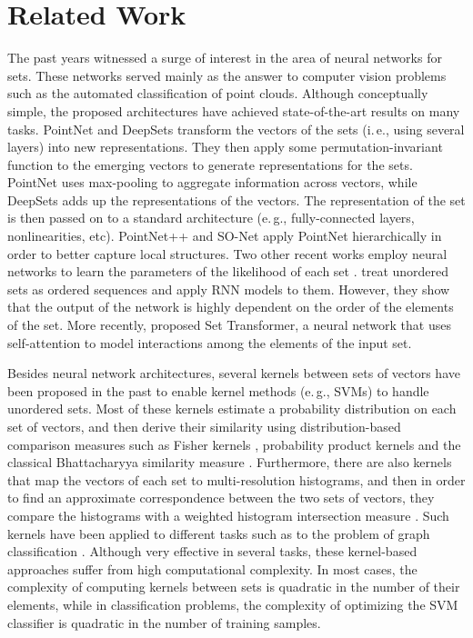 \documentclass[twoside]{article}
\newcommand{\eg}{e.\,g., }
\newcommand{\ie}{i.\,e., }
\begin{document}
\section{Related Work}\label{sec:related_work}
The past years witnessed a surge of interest in the area of neural networks for sets.
These networks served mainly as the answer to computer vision problems such as the automated classification of point clouds.
Although conceptually simple, the proposed architectures have achieved state-of-the-art results on many tasks.
PointNet \citep{qi2017pointnet} and DeepSets \citep{zaheer2017deep} transform the vectors of the sets (\ie using several layers) into new representations.
They then apply some permutation-invariant function to the emerging vectors to generate representations for the sets.
PointNet uses max-pooling to aggregate information across vectors, while DeepSets adds up the representations of the vectors.
The representation of the set is then passed on to a standard architecture (\eg fully-connected layers, nonlinearities, etc).
PointNet++ \citep{qi2017pointnet++} and SO-Net \citep{li2018so} apply PointNet hierarchically in order to better capture local structures.
Two other recent works employ neural networks to learn the parameters of the likelihood of each set \citep{rezatofighi2017deepsetnet,rezatofighi2018joint}.
\cite{vinyals2015order} treat unordered sets as ordered sequences and apply RNN models to them.
However, they show that the output of the network is highly dependent on the order of the elements of the set.
More recently, \cite{lee2019set} proposed Set Transformer, a neural network that uses self-attention to model interactions among the elements of the input set.

Besides neural network architectures, several kernels between sets of vectors have been proposed in the past to enable kernel methods (\eg SVMs) to handle unordered sets.
Most of these kernels estimate a probability distribution on each set of vectors, and then derive their similarity using distribution-based comparison measures such as Fisher kernels \citep{jaakkola1999exploiting}, probability product kernels \citep{jebara2004probability,lyu2005kernel} and the classical Bhattacharyya similarity measure \citep{kondor2003kernel}.
Furthermore, there are also kernels that map the vectors of each set to multi-resolution histograms, and then in order to find an approximate correspondence between the two sets of vectors, they compare the histograms with a weighted histogram intersection measure  \citep{grauman2007pyramid,grauman2007approximate}.
Such kernels have been applied to different tasks such as to the problem of graph classification \citep{nikolentzos2017matching}.
Although very effective in several tasks, these kernel-based approaches suffer from high computational complexity.
In most cases, the complexity of computing kernels between sets is quadratic in the number of their elements, while in classification problems, the complexity of optimizing the SVM classifier is quadratic in the number of training samples. 
\end{document}
